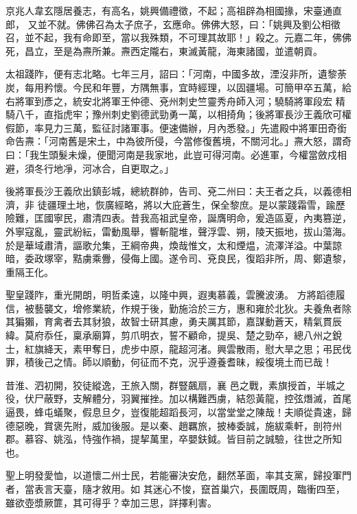 \begin{pinyinscope}
 京兆人韋玄隱居養志，有高名，姚興備禮徵，不起；高祖辟為相國掾，宋臺通直郎，
 又並不就。佛佛召為太子庶子，玄應命。佛佛大怒，曰：「姚興及劉公相徵召，並不起，我有命即至，當以我殊類，不可理其故耶！」殺之。元嘉二年，佛佛死，昌立，至是為燾所兼。燾西定隴右，東滅黃龍，海東諸國，並遣朝貢。



 太祖踐阼，便有志北略。七年三月，詔曰：「河南，中國多故，湮沒非所，遺黎荼炭，每用矜懷。今民和年豐，方隅無事，宜時經理，以固疆場。可簡甲卒五萬，給右將軍到彥之，統安北將軍王仲德、兗州刺史竺靈秀舟師入河；驍騎將軍段宏
 精騎八千，直指虎牢；豫州刺史劉德武勁勇一萬，以相掎角；後將軍長沙王義欣可權假節，率見力三萬，監征討諸軍事。便速備辦，月內悉發。」先遣殿中將軍田奇銜命告燾：「河南舊是宋土，中為彼所侵，今當修復舊境，不關河北。」燾大怒，謂奇曰：「我生頭髮未燥，便聞河南是我家地，此豈可得河南。必進軍，今權當斂戍相避，須冬行地凈，河冰合，自更取之。」



 後將軍長沙王義欣出鎮彭城，總統群帥，告司、兗二州曰：夫王者之兵，以義德相濟，非
 徒疆理土地，恢廣經略，將以大庇蒼生，保全黎庶。是以蒙踐霜雪，踰歷險難，匡國寧民，肅清四表。昔我高祖武皇帝，誕膺明命，爰造區夏，內夷篡逆，外寧寇亂，靈武紛紜，雷動風舉，響斬龍堆，聲浮雲、朔，陵天振地，拔山蕩海。於是華域肅清，謳歌允集，王綱帝典，煥哉惟文，太和煙煴，流澤洋溢。中葉諒暗，委政塚宰，黠虜乘釁，侵侮上國。遂令司、兗良民，復蹈非所，周、鄭遺黎，重隔王化。



 聖皇踐阼，重光開朗，明哲柔遠，以隆中興，遐夷慕義，雲騰波湧。
 方將蹈德履信，被藝襲文，增修業統，作規于後，勤施洽於三方，惠和雍於北狄。夫養魚者除其猵獺，育禽者去其豺狼，故智士研其慮，勇夫厲其節，嘉謀動蒼天，精氣貫辰緯。莫府忝任，稟承廟算，剪爪明衣，誓不顧命，提吳、楚之勁卒，總八州之銳士，紅旗絳天，素甲奪日，虎步中原，龍超河渚。興雲散雨，慰大旱之思；弔民伐罪，積後己之情。師以順動，何征而不克，況乎遵養耆昧，綏復境土而已哉！



 昔淮、泗初開，狡徒縱逸，王旅入關，群豎飆扇，襄
 邑之戰，素旗授首，半城之役，伏尸蔽野，支解體分，羽翼摧挫。加以構難西虜，結怨黃龍，控弦熸滅，首尾逼畏，蜂屯蟻聚，假息旦夕，豈復能超蹈長河，以當堂堂之陳哉！夫順從貴速，歸德惡晚，賞褒先附，威加後服。是以秦、趙羈旅，披棒委誠，施紱乘軒，剖符州郡。慕容、姚泓，恃強作禍，提挈萬里，卒嬰鈇鉞。皆目前之誠驗，往世之所知也。



 聖上明發愛恤，以道懷二州士民，若能審決安危，翻然革面，率其支黨，歸投軍門者，當表言天臺，隨才敘用。如
 其迷心不悛，竄首巢穴，長圍既周，臨衝四至，雖欲壺漿厥篚，其可得乎？幸加三思，詳擇利害。




\end{pinyinscope}
